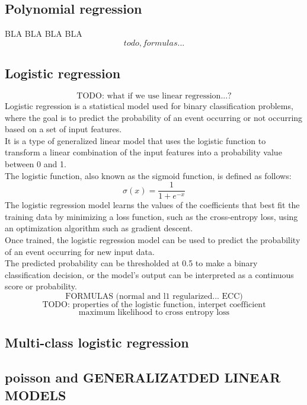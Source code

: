 \documentclass{article}
\begin{document}
\subsection{Polynomial regression}
BLA BLA BLA BLA
\[todo, formulas...\]
\subsection{Logistic regression}
\[\text{TODO: what if we use linear regression...?}\]
Logistic regression is a statistical model used for binary classification problems, where the goal is to predict the probability of an event occurring or not occurring based on a set of input features.\\
It is a type of generalized linear model that uses the logistic function to transform a linear combination of the input features into a probability value between 0 and 1.\\
The logistic function, also known as the sigmoid function, is defined as follows:\\
\[\sigma(x) = \frac{1}{1 + e^{-x}}\]
The logistic regression model learns the values of the coefficients that best fit the training data by minimizing a loss function, such as the cross-entropy loss, using an optimization algorithm such as gradient descent.\\
Once trained, the logistic regression model can be used to predict the probability of an event occurring for new input data.\\
The predicted probability can be thresholded at 0.5 to make a binary classification decision, or the model's output can be interpreted as a continuous score or probability.
\[\text{FORMULAS (normal and l1 regularized... ECC)}\]
\[\text{TODO: properties of the logistic function, interpet coefficient}\]
\[\text{maximum likelihood to cross entropy loss}\]
\subsection{Multi-class logistic regression}
\subsection{poisson and GENERALIZATDED LINEAR MODELS}
\end{document}
